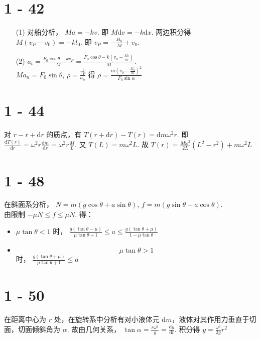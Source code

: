 \documentclass{article}
\newcommand{\dd}{\mathrm{d}}
\begin{document}
\section*{1 - 42}

\begin{itemize}
    \item [(1)] 对船分析， $Ma = -kv$. 即 $M\dd v = -k \dd x$. 两边积分得 $M(v_P - v_0) = -kl_0$. 即 $v_P = -\frac{kl_0}{M} + v_0$.
    \item [(2)] $a_t = \frac{F_0\cos \theta - kv_P}{M} = \frac{F_0\cos \theta - k\left(v_0 - \frac{kl_0}{m}\right)}{M}$. \\
    $Ma_n = F_0\sin \theta$, $\rho = \frac{v_P^2}{a_n}$ 得 $\rho = \frac{m\left(v_0 - \frac{kl_0}{m}\right)^2}{F_0 \sin\alpha}$
\end{itemize}

\section*{1 - 44}

对 $r - r + \dd r$ 的质点，有 $T(r + \dd r) - T(r) = \dd m\omega^2 r$.
即 $\frac{\dd T(r)}{\dd r} = \omega^2 r \frac{\dd m}{\dd r} = \omega^2 r \frac{M}{L}$. 又 $T(L) = m\omega^2 L$. 故 $T(r) = \frac{M\omega^2}{2L}(L^2 - r^2) + m\omega^2 L$

\section*{1 - 48}

在斜面系分析， $N = m(g\cos \theta + a \sin \theta)$, $f = m(g\sin \theta - a\cos \theta)$. \\
由限制 $-\mu N \leq f \leq \mu N$, 得：\begin{itemize}
    \item $\mu \tan \theta < 1$ 时， $\frac{g(\tan \theta - \mu)}{\mu \tan \theta + 1} \leq a \leq \frac{g(\tan \theta + \mu)}{1 - \mu\tan \theta}$
    \item $$\mu \tan \theta > 1$$ 时， $\frac{g(\tan \theta + \mu)}{\mu \tan \theta + 1} \leq a $
\end{itemize}

\section*{1 - 50}

在距离中心为 $r$ 处，在旋转系中分析有对小液体元 $\dd m$，液体对其作用力垂直于切面，切面倾斜角为 $\alpha$. 故由几何关系， $\tan \alpha = \frac{r \omega^2}{g} = \frac{\dd y}{\dd t}$. 积分得 $y = \frac{\omega^2}{2g}r^2$
\end{document}
